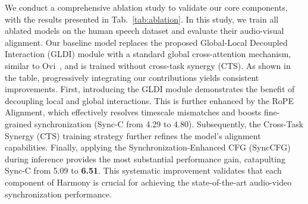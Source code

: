 We conduct a comprehensive ablation study to validate our core components, with the results presented in Tab.~\ref{tab:ablation}. In this study, we train all ablated models on the human speech dataset and evaluate their audio-visual alignment. Our baseline model replaces the proposed Global-Local Decoupled Interaction (GLDI) module with a standard global cross-attention mechanism, similar to Ovi~\cite{low2025ovi}, and is trained without cross-task synergy (CTS). As shown in the table, progressively integrating our contributions yields consistent improvements. First, introducing the GLDI module demonstrates the benefit of decoupling local and global interactions. This is further enhanced by the RoPE Alignment, which effectively resolves timescale mismatches and boosts fine-grained synchronization (Sync-C from 4.29 to 4.80). Subsequently, the Cross-Task Synergy (CTS) training strategy further refines the model's alignment capabilities. Finally, applying the Synchronization-Enhanced CFG (SyncCFG) during inference provides the most substantial performance gain, catapulting Sync-C from 5.09 to \textbf{6.51}. This systematic improvement validates that each component of Harmony is crucial for achieving the state-of-the-art audio-video synchronization performance.


